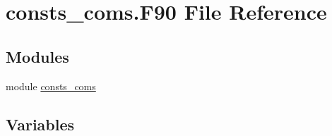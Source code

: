 \hypertarget{consts__coms_8_f90}{}\section{consts\+\_\+coms.\+F90 File Reference}
\label{consts__coms_8_f90}
\subsection*{Modules}
\begin{DoxyCompactItemize}
\item 
module \hyperlink{namespaceconsts__coms}{consts\+\_\+coms}
\end{DoxyCompactItemize}
\subsection*{Variables}
